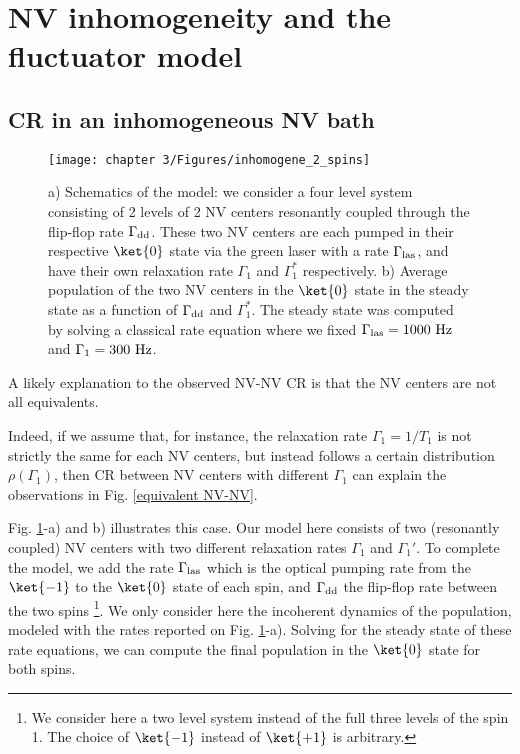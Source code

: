 \documentclass[a4paper, 11pt]{report}
\begin{document}
\section{NV inhomogeneity and the fluctuator model}

\subsection{CR in an inhomogeneous NV bath}
\begin{figure}[h]
\centering
\texttt{[image: chapter 3/Figures/inhomogene\_2\_spins]}
\caption{a) Schematics of the model: we consider a four level system consisting of 2 levels of 2 NV centers resonantly coupled through the flip-flop rate $\Gamma_{\rm dd}$. These two NV centers are each pumped in their respective $\ket{0}$ state via the green laser with a rate $\Gamma_{\rm las}$, and have their own relaxation rate $\Gamma_1$ and $\Gamma_1^*$ respectively. b) Average population of the two NV centers in the $\ket{0}$ state in the steady state as a function of $\Gamma_{\rm dd}$ and $\Gamma_1^*$. The steady state was computed by solving a classical rate equation where we fixed $\Gamma_{\rm las}=1000\ \rm Hz$ and $\Gamma_1=300\ \rm Hz$.}
\label{inhomogene}
\end{figure}
A likely explanation to the observed NV-NV CR is that the NV centers are not all equivalents.

Indeed, if we assume that, for instance, the relaxation rate $\Gamma_1=1/T_1$ is not strictly the same for each NV centers, but instead follows a certain distribution $\rho(\Gamma_1)$, then CR between NV centers with different $\Gamma_1$ can explain the observations in Fig. \ref{equivalent NV-NV}.

Fig. \ref{inhomogene}-a) and b) illustrates this case. Our model here consists of two (resonantly coupled) NV centers with two different relaxation rates $\Gamma_1$ and $\Gamma_1'$. To complete the model, we add the rate $\Gamma_{\rm las}$ which is the optical pumping rate from the $\ket{-1}$ to the $\ket{0}$ state of each spin, and $\Gamma_{\rm dd}$ the flip-flop rate between the two spins \footnote{We consider here a two level system instead of the full three levels of the spin 1. The choice of $\ket{-1}$ instead of $\ket{+1}$ is arbitrary.}. We only consider here the incoherent dynamics of the population, modeled with the rates reported on Fig. \ref{inhomogene}-a). Solving for the steady state of these rate equations, we can compute the final population in the $\ket{0}$ state for both spins. 
\end{document}
